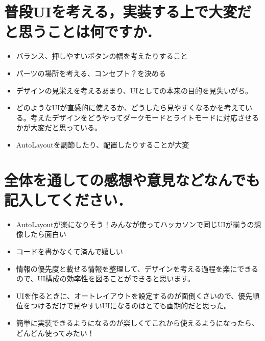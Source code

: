 \section{普段UIを考える，実装する上で大変だと思うことは何ですか．}
\begin{itemize}
	\item バランス、押しやすいボタンの幅を考えたりすること
	\item パーツの場所を考える、コンセプト？を決める
	\item デザインの見栄えを考えるあまり、UIとしての本来の目的を見失いがち。
	\item どのようなUIが直感的に使えるか、どうしたら見やすくなるかを考えている。考えたデザインをどうやってダークモードとライトモードに対応させるかが大変だと思っている。
	\item AutoLayoutを調節したり、配置したりすることが大変

\end{itemize}

\section{全体を通しての感想や意見などなんでも記入してください．}
\begin{itemize}
	\item AutoLayoutが楽になりそう！みんなが使ってハッカソンで同じUIが揃うの想像したら面白い
	\item コードを書かなくて済んで嬉しい
	\item 情報の優先度と載せる情報を整理して、デザインを考える過程を楽にできるので、UI構成の効率性を図ることができると思います。
	\item UIを作るときに、オートレイアウトを設定するのが面倒くさいので、優先順位をつけるだけで見やすいUIになるのはとても画期的だと思った。
	\item 簡単に実装できるようになるのが楽しくてこれから使えるようになったら、どんどん使ってみたい！
\end{itemize}